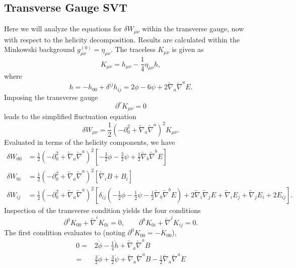 \documentclass[10pt,letterpaper]{article}
\numberwithin{equation}{subsection}
\begin{document}
\subsection{Transverse Gauge SVT}
Here we will analyze the equations for $\delta W_{\mu\nu}$ within the transverse gauge, now with respect to the helicity decomposition. Results are calculated within the Minkowski background $g_{\mu\nu}^{(0)} = \eta_{\mu\nu}$. The traceless $K_{\mu\nu}$ is given as
\begin{equation}
K_{\mu\nu} = h_{\mu\nu} - \frac14 \eta_{\mu\nu} h,
\end{equation}
where 
\begin{equation}
h = -h_{00}+ \delta^{ij}h_{ij} = 2\phi - 6\psi + 2\tilde\nabla_a \tilde\nabla^a E.
\end{equation}
Imposing the transverse gauge 
\begin{equation}
\partial^\nu K_{\mu\nu} = 0
\end{equation}
leads to the simplified fluctuation equation
\begin{equation}
\delta W_{\mu\nu} = \frac12 \left( - \partial_0^2 +  \tilde\nabla_a\tilde\nabla^a\right)^2 K_{\mu\nu} .
\end{equation}
Evaluated in terms of the helicity components, we have
\begin{align}
\delta W_{00}&{}=\frac12\left( - \partial_0^2 +  \tilde\nabla_a\tilde\nabla^a\right)^2 \left[ -\frac32 \phi - \frac32 \psi + \frac12  \tilde\nabla_b\tilde\nabla^b  E\right]
\nonumber\\
\delta W_{0i}&{} = \frac12\left( - \partial_0^2 +  \tilde\nabla_a\tilde\nabla^a\right)^2 \left[ \tilde\nabla_i B + B_i\right]
\nonumber\\
\delta W_{ij}&{} = \frac12 \left( - \partial_0^2 +  \tilde\nabla_a\tilde\nabla^a\right)^2 \left[ \delta_{ij}\left( - \frac12 \phi - \frac12 \psi -\frac12  \tilde\nabla_b\tilde\nabla^b E \right)
+ 2 \tilde\nabla_i \tilde\nabla_j E + \tilde\nabla_i E_j + \tilde\nabla_j E_i + 2E_{ij}\right].
\end{align}
Inspection of the transverse condition yields the four conditions
\begin{equation}
\partial^0K_{00} + \tilde\nabla^i K_{0i}=0,\qquad \partial^0K_{0i} + \tilde\nabla^j K_{ij} = 0.
\end{equation}
The first condition evaluates to (noting $\partial^0 K_{00} = -\dot K_{00}$),
\begin{align}
0=&{} 2\dot\phi - \frac14 \dot h +  \tilde\nabla_a\tilde\nabla^a B
\nonumber\\
=&\frac32 \dot\phi + \frac32 \dot \psi +  \tilde\nabla_a\tilde\nabla^a B - \frac12  \tilde\nabla_a\tilde\nabla^a \dot E
\end{align}
\end{document}
